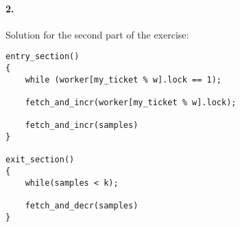 \paragraph{2.}
Solution for the second part of the exercise:

\begin{lstlisting}[style=mycode]
entry_section()
{
	while (worker[my_ticket % w].lock == 1);
	
	fetch_and_incr(worker[my_ticket % w].lock);

	fetch_and_incr(samples)
}

exit_section()
{
	while(samples < k);

	fetch_and_decr(samples)
}

\end{lstlisting}

